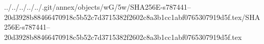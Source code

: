 ../../../../../.git/annex/objects/wG/5w/SHA256E-s787441--20d3928b88466470918c5b52c7d3715382f2602c8a3b1cc1abf0765307919d5f.tex/SHA256E-s787441--20d3928b88466470918c5b52c7d3715382f2602c8a3b1cc1abf0765307919d5f.tex
